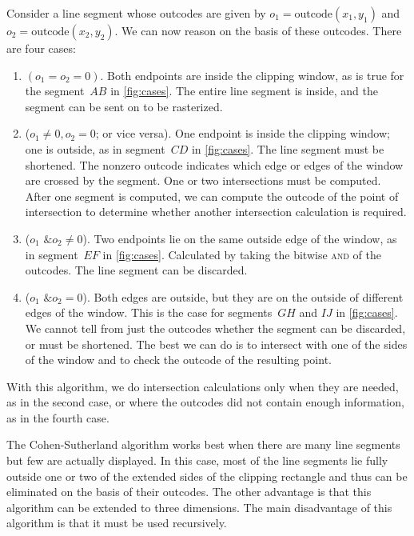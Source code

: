 \documentclass[../COS3712_Notes.tex]{subfiles}
\begin{document}
        Consider a line segment whose outcodes are given by $o_1 = \text{outcode}(x_1, y_1)$ and
        $o_2 = \text{outcode}(x_2, y_2)$.
        We can now reason on the basis of these outcodes.
        There are four cases:
        \begin{enumerate}
          \item $(o_1 = o_2 = 0)$. Both endpoints are inside the clipping window,
            as is true for the segment~$AB$ in \autoref{fig:cases}.
            The entire line segment is inside, and the segment can be sent on to be rasterized.
          \item ($o_1 \neq 0, o_2 = 0$; or vice versa). One endpoint is inside the clipping window;
            one is outside, as in segment~$CD$ in \autoref{fig:cases}.
            The line segment must be shortened.
            The nonzero outcode indicates which edge or edges of the window are crossed
            by the segment.
            One or two intersections must be computed.
            After one segment is computed, we can compute the outcode of the point of intersection
            to determine whether another intersection calculation is required.
          \item ($o_1 \text{ \& } o_2 \neq 0$). Two endpoints lie on the same outside edge of the
            window, as in segment~$EF$ in \autoref{fig:cases}.
            Calculated by taking the bitwise \textsc{and} of the outcodes.
            The line segment can be discarded.
          \item ($o_1 \text{ \& } o_2 = 0$). Both edges are outside, but they are on the outside
            of different edges of the window.
            This is the case for segments~$GH$ and $IJ$ in \autoref{fig:cases}.
            We cannot tell from just the outcodes whether the segment can be discarded,
            or must be shortened.
            The best we can do is to intersect with one of the sides of the window and to check
            the outcode of the resulting point.
        \end{enumerate}

        With this algorithm, we do intersection calculations only when they are needed,
        as in the second case, or where the outcodes did not contain enough information,
        as in the fourth case.

        The Cohen-Sutherland algorithm works best when there are many line segments but few
        are actually displayed.
        In this case, most of the line segments lie fully outside one or two of the extended
        sides of the clipping rectangle and thus can be eliminated on the basis of their outcodes.
        The other advantage is that this algorithm can be extended to three dimensions.
        The main disadvantage of this algorithm is that it must be used recursively.
\end{document}
